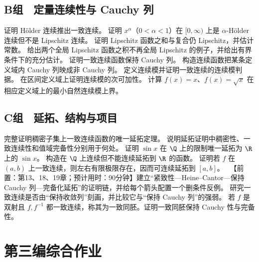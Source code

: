 \subsection*{B组　定量连续性与 Cauchy 列}
\begin{enumerate}[label=\textbf{19.\arabic*.},resume]
  \mustdo 证明 Hölder 连续推出一致连续。
  \mustdo 证明 \(x^\alpha\)（\(0<\alpha<1\)）在 \([0,\infty)\) 上是 \(\alpha\)-Hölder 连续但不是 Lipschitz 连续。
  \mustdo 证明 Lipschitz 函数之和与复合仍 Lipschitz，并估计常数。
  \mustdo 给出两个全局 Lipschitz 函数之积不再全局 Lipschitz 的例子，并给出有界条件下的充分估计。
  \mustdo 证明一致连续函数保持 Cauchy 列。
  \mustdo 构造连续函数把某条定义域内 Cauchy 列映成非 Cauchy 列。
  \mustdo 定义连续模并证明一致连续的连续模判据。
  \mustdo 在区间定义域上证明连续模的次可加性。
  \mustdo 计算 \(f(x)=x\)、\(f(x)=\sqrt x\) 在相应定义域上的最小自然连续模上界。
\end{enumerate}

\subsection*{C组　延拓、结构与项目}
\begin{enumerate}[label=\textbf{19.\arabic*.},resume]
  \mustdo 完整证明稠密子集上一致连续函数的唯一延拓定理。
  \mustdo 说明延拓证明中稠密性、一致连续性和值域完备性分别用于何处。
  \mustdo 证明 \(\sin x\) 在 \(\Q\) 上的限制唯一延拓为 \(\R\) 上的 \(\sin x\)。
  \optionaldo 构造在 \(\Q\) 上连续但不能连续延拓到 \(\R\) 的函数。
  \optionaldo 证明若 \(f\) 在 \((a,b)\) 上一致连续，则左右有限极限存在，因而可连续延拓到 \([a,b]\)。
  \projectdo\ 【前置：第13、18、19章；预计用时：90分钟】建立“紧致性—Heine--Cantor—保持 Cauchy 列—完备化延拓”的证明链，并给每个箭头配置一个删条件反例。
  \opendo 研究一致连续是否由“保持收敛列”刻画，并比较它与“保持 Cauchy 列”的强弱。
  \optionaldo 若 \(f\) 是双射且 \(f,f^{-1}\) 都一致连续，称其为一致同胚。证明一致同胚保持 Cauchy 性与完备性。
\end{enumerate}

\section*{第三编综合作业}

